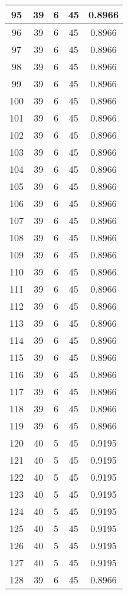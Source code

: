 \documentclass[letterpaper, 12pt]{article}
\begin{document}
\begin{longtable}{|c|c|c|c|c|}
95 & 39 & 6 & 45 & 0.8966 \\
\hline
96 & 39 & 6 & 45 & 0.8966 \\
\hline
97 & 39 & 6 & 45 & 0.8966 \\
\hline
98 & 39 & 6 & 45 & 0.8966 \\
\hline
99 & 39 & 6 & 45 & 0.8966 \\
\hline
100 & 39 & 6 & 45 & 0.8966 \\
\hline
101 & 39 & 6 & 45 & 0.8966 \\
\hline
102 & 39 & 6 & 45 & 0.8966 \\
\hline
103 & 39 & 6 & 45 & 0.8966 \\
\hline
104 & 39 & 6 & 45 & 0.8966 \\
\hline
105 & 39 & 6 & 45 & 0.8966 \\
\hline
106 & 39 & 6 & 45 & 0.8966 \\
\hline
107 & 39 & 6 & 45 & 0.8966 \\
\hline
108 & 39 & 6 & 45 & 0.8966 \\
\hline
109 & 39 & 6 & 45 & 0.8966 \\
\hline
110 & 39 & 6 & 45 & 0.8966 \\
\hline
111 & 39 & 6 & 45 & 0.8966 \\
\hline
112 & 39 & 6 & 45 & 0.8966 \\
\hline
113 & 39 & 6 & 45 & 0.8966 \\
\hline
114 & 39 & 6 & 45 & 0.8966 \\
\hline
115 & 39 & 6 & 45 & 0.8966 \\
\hline
116 & 39 & 6 & 45 & 0.8966 \\
\hline
117 & 39 & 6 & 45 & 0.8966 \\
\hline
118 & 39 & 6 & 45 & 0.8966 \\
\hline
119 & 39 & 6 & 45 & 0.8966 \\
\hline
120 & 40 & 5 & 45 & 0.9195 \\
\hline
121 & 40 & 5 & 45 & 0.9195 \\
\hline
122 & 40 & 5 & 45 & 0.9195 \\
\hline
123 & 40 & 5 & 45 & 0.9195 \\
\hline
124 & 40 & 5 & 45 & 0.9195 \\
\hline
125 & 40 & 5 & 45 & 0.9195 \\
\hline
126 & 40 & 5 & 45 & 0.9195 \\
\hline
127 & 40 & 5 & 45 & 0.9195 \\
\hline
128 & 39 & 6 & 45 & 0.8966 \\

\end{longtable}
\end{document}

